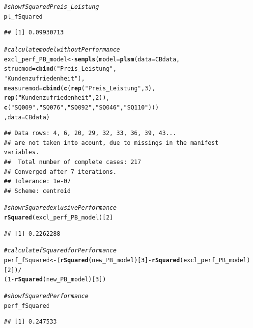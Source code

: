 \documentclass{article}\usepackage[]{graphicx}\usepackage[]{color}
\makeatletter
\newcommand{\hlnum}[1]{\textcolor[rgb]{0.686,0.059,0.569}{#1}}%
\newcommand{\hlstr}[1]{\textcolor[rgb]{0.192,0.494,0.8}{#1}}%
\newcommand{\hlcom}[1]{\textcolor[rgb]{0.678,0.584,0.686}{\textit{#1}}}%
\newcommand{\hlopt}[1]{\textcolor[rgb]{0,0,0}{#1}}%
\newcommand{\hlstd}[1]{\textcolor[rgb]{0.345,0.345,0.345}{#1}}%
\newcommand{\hlkwb}[1]{\textcolor[rgb]{0.69,0.353,0.396}{#1}}%
\newcommand{\hlkwc}[1]{\textcolor[rgb]{0.333,0.667,0.333}{#1}}%
\newcommand{\hlkwd}[1]{\textcolor[rgb]{0.737,0.353,0.396}{\textbf{#1}}}%
\newenvironment{kframe}{%
 \def\at@end@of@kframe{}%
 \ifinner\ifhmode%
  \def\at@end@of@kframe{\end{minipage}}%
  \begin{minipage}{\columnwidth}%
 \fi\fi%
 \def\FrameCommand##1{\hskip\@totalleftmargin \hskip-\fboxsep
 \colorbox{shadecolor}{##1}\hskip-\fboxsep
     \hskip-\linewidth \hskip-\@totalleftmargin \hskip\columnwidth}%
 \MakeFramed {\advance\hsize-\width
   \@totalleftmargin\z@ \linewidth\hsize
   \@setminipage}}%
 {\par\unskip\endMakeFramed%
 \at@end@of@kframe}
\newenvironment{knitrout}{}{} %
\makeatother
\begin{document}
\begin{knitrout}
\begin{kframe}
\begin{alltt}
\hlcom{#show fSquared Preis_Leistung}
\hlstd{pl_fSquared}
\end{alltt}
\begin{verbatim}
## [1] 0.09930713
\end{verbatim}
\begin{alltt}
\hlcom{#calculate model without Performance}
\hlstd{excl_perf_PB_model} \hlkwb{<-} \hlkwd{sempls}\hlstd{(}\hlkwc{model} \hlstd{=} \hlkwd{plsm}\hlstd{(}\hlkwc{data} \hlstd{= CBdata,}
                \hlkwc{strucmod} \hlstd{=} \hlkwd{cbind}\hlstd{(}\hlstr{"Preis_Leistung"}\hlstd{,}
                                 \hlstr{"Kundenzufriedenheit"}\hlstd{),}
                \hlkwc{measuremod} \hlstd{=} \hlkwd{cbind}\hlstd{(}\hlkwd{c}\hlstd{(}\hlkwd{rep}\hlstd{(}\hlstr{"Preis_Leistung"}\hlstd{,}\hlnum{3}\hlstd{),}
                                     \hlkwd{rep}\hlstd{(}\hlstr{"Kundenzufriedenheit"}\hlstd{,}\hlnum{2}\hlstd{)),}
                                   \hlkwd{c}\hlstd{(}\hlstr{"SQ009"}\hlstd{,}\hlstr{"SQ076"}\hlstd{,}\hlstr{"SQ092"}\hlstd{,}\hlstr{"SQ046"}\hlstd{,}\hlstr{"SQ110"}\hlstd{)))}
                \hlstd{,}\hlkwc{data} \hlstd{= CBdata)}
\end{alltt}
\begin{verbatim}
## Data rows: 4, 6, 20, 29, 32, 33, 36, 39, 43...
## are not taken into acount, due to missings in the manifest variables.
##  Total number of complete cases: 217 
## Converged after 7 iterations.
## Tolerance: 1e-07
## Scheme: centroid
\end{verbatim}
\begin{alltt}
\hlcom{#show rSquared exlusive Performance}
\hlkwd{rSquared}\hlstd{(excl_perf_PB_model)[}\hlnum{2}\hlstd{]}
\end{alltt}
\begin{verbatim}
## [1] 0.2262288
\end{verbatim}
\begin{alltt}
\hlcom{#calculate fSquared for Performance}
\hlstd{perf_fSquared} \hlkwb{<-} \hlstd{(}\hlkwd{rSquared}\hlstd{(new_PB_model)[}\hlnum{3}\hlstd{]}\hlopt{-}\hlkwd{rSquared}\hlstd{(excl_perf_PB_model)[}\hlnum{2}\hlstd{])}\hlopt{/}
                  \hlstd{(}\hlnum{1}\hlopt{-}\hlkwd{rSquared}\hlstd{(new_PB_model)[}\hlnum{3}\hlstd{])}

\hlcom{#show fSquared Performance}
\hlstd{perf_fSquared}
\end{alltt}
\begin{verbatim}
## [1] 0.247533
\end{verbatim}
\end{kframe}
\end{knitrout}
\end{document}
